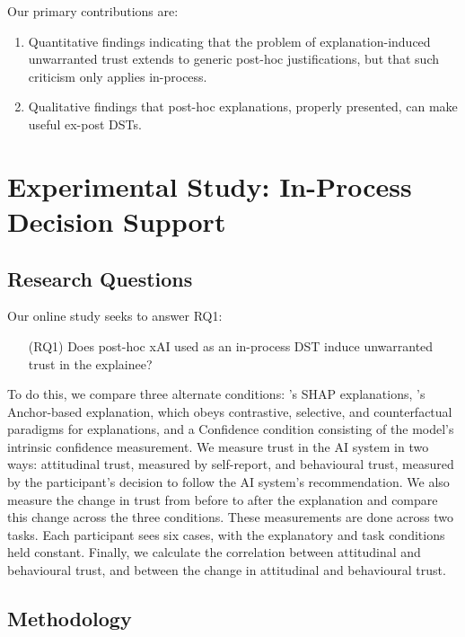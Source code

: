 Our primary contributions are:

\begin{enumerate}
    \item Quantitative findings indicating that the problem of explanation-induced unwarranted trust extends to generic post-hoc justifications, but that such criticism only applies in-process.
    \item Qualitative findings that post-hoc explanations, properly presented, can make useful ex-post DSTs.
\end{enumerate}

\section[Experimental Study]{Experimental Study: In-Process Decision Support}\label{sec:online}
\subsection{Research Questions}
Our online study seeks to answer RQ1:

\begin{enumerate}
    \item[(RQ1)] Does post-hoc xAI used as an in-process DST induce unwarranted trust in the explainee?
\end{enumerate}

To do this, we compare three alternate conditions: \textcite{lundberg_unified_2017}'s SHAP explanations, \textcite{ribeiro_anchors_2018}'s Anchor-based explanation, which obeys contrastive, selective, and counterfactual paradigms for explanations, and a Confidence condition consisting of the model's intrinsic confidence measurement. We measure trust in the AI system in two ways: attitudinal trust, measured by self-report, and behavioural trust, measured by the participant's decision to follow the AI system's recommendation. We also measure the change in trust from before to after the explanation and compare this change across the three conditions. These measurements are done across two tasks. Each participant sees six cases, with the explanatory and task conditions held constant. Finally, we calculate the correlation between attitudinal and behavioural trust, and between the change in attitudinal and behavioural trust.

\subsection{Methodology}

